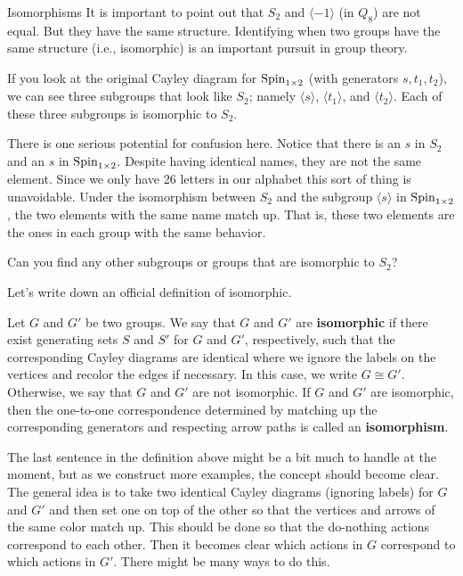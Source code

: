 \begin{section}{Isomorphisms}
It is important to point out that $S_2$ and $\langle -1\rangle$ (in $Q_8$) are not equal.  But they have the same structure.  Identifying when two groups have the same structure (i.e., isomorphic) is an important pursuit in group theory.

If you look at the original Cayley diagram for $\operatorname{Spin}_{1\times 2}$ (with generators $s, t_1, t_2$), we can see three subgroups that look like $S_2$; namely $\langle s\rangle$, $\langle t_1\rangle$, and $\langle t_2\rangle$.  Each of these three subgroups is isomorphic to $S_2$.  

There is one serious potential for confusion here.  Notice that there is an $s$ in $S_2$ and an $s$ in $\operatorname{Spin}_{1\times 2}$.  Despite having identical names, they are not the same element.  Since we only have 26 letters in our alphabet this sort of thing is unavoidable.  Under the isomorphism between $S_2$ and the subgroup $\langle s\rangle$ in $\operatorname{Spin}_{1\times 2}$, the two elements with the same name match up.  That is, these two elements are the ones in each group with the same behavior.

\begin{exercise}
Can you find any other subgroups or groups that are isomorphic to $S_2$?
\end{exercise}

Let's write down an official definition of isomorphic.

\begin{definition}
Let $G$ and $G'$ be two groups.  We say that $G$ and $G'$ are \textbf{isomorphic} if there exist generating sets $S$ and $S'$ for $G$ and $G'$, respectively, such that the corresponding Cayley diagrams are identical where we ignore the labels on the vertices and recolor the edges if necessary.  In this case, we write $G\cong G'$.  Otherwise, we say that $G$ and $G'$ are not isomorphic.  If $G$ and $G'$ are isomorphic, then the one-to-one correspondence determined by matching up the corresponding generators and respecting arrow paths is called an \textbf{isomorphism}.
\end{definition}

The last sentence in the definition above might be a bit much to handle at the moment, but as we construct more examples, the concept should become clear.  The general idea is to take two identical Cayley diagrams (ignoring labels) for $G$ and $G'$ and then set one on top of the other so that the vertices and arrows of the same color match up.  This should be done so that the do-nothing actions correspond to each other.  Then it becomes clear which actions in $G$ correspond to which actions in $G'$.  There might be many ways to do this.


\end{section}
